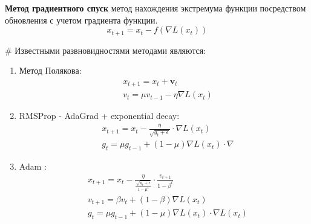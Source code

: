  \textbf{Метод градиентного спуск} метод нахождения экстремума функции
посредством обновления с учетом градиента функции.
\begin{equation}
    x_{t+1} = x_t - f(\nabla L(x_t))  
\end{equation}


#
Известными развновидностями методами являются:\begin{enumerate}
    \item Метод Полякова:
        \begin{equation}
            \begin{aligned}
                &x_{t+1}= x_t + \mathbf{v}_t \\
                &v_t = \mu v_{t-1} - \eta \nabla L(x_t)
            \end{aligned}
        \end{equation}
    \item RMSProp - AdaGrad + exponential decay:
        \begin{equation}
            \begin{aligned}
                &x_{t+1} = x_t - \frac{\eta}{\sqrt{g_t+\epsilon}} \cdot \nabla L(x_t) \\
                &g_t = \mu g_{t-1} + (1-\mu)\nabla L(x_t) \cdot \nabla  
            \end{aligned}
        \end{equation}
    \item Adam :
        \begin{equation}
            \begin{aligned}
                &x_{t+1} = x_t - \frac{\eta}{\frac{\sqrt{g_t+\epsilon}}{1-\mu^t}} \cdot \frac{v_{t+1}}{1-\beta^t} \\
                &v_{t+1} = \beta v_t + (1-\beta) \nabla L(x_t) \\
                &g_t = \mu g_{t-1} + (1-\mu)\nabla L(x_t) \cdot \nabla  L(x_t)
            \end{aligned}
        \end{equation}
\end{enumerate}












